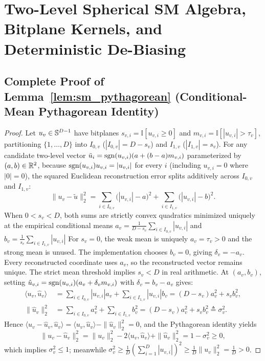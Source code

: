 \section{Two-Level Spherical SM Algebra, Bitplane Kernels, and Deterministic De-Biasing}
\label{app:sm_algebra}

\subsection{Complete Proof of Lemma~\ref{lem:sm_pythagorean} (Conditional-Mean Pythagorean Identity)}
\begin{proof}
Let $u_v \in \mathbb{S}^{D-1}$ have bitplanes $s_{v,i} = \mathbb{I}[u_{v,i} \ge 0]$ and $m_{v,i} = \mathbb{I}[|u_{v,i}| > \tau_v]$, partitioning $\{1,\dots,D\}$ into $I_{0,v}$ ($|I_{0,v}| = D - s_v$) and $I_{1,v}$ ($|I_{1,v}| = s_v$).
For any candidate two-level vector $\tilde{u}_i = \operatorname{sgn}(u_{v,i})(a + (b - a)m_{v,i})$ parameterized by $(a, b) \in \mathbb{R}^2$, because $\operatorname{sgn}(u_{v,i})u_{v,i} = |u_{v,i}|$ for every $i$ (including $u_{v,i} = 0$ where $|0| = 0$), the squared Euclidean reconstruction error splits additively across $I_{0,v}$ and $I_{1,v}$:
\begin{equation}
  \|u_v - \tilde{u}\|_2^2
  = \sum_{i \in I_{0,v}}\bigl(|u_{v,i}| - a\bigr)^2 + \sum_{i \in I_{1,v}}\bigl(|u_{v,i}| - b\bigr)^2.
\end{equation}
When $0 < s_v < D$, both sums are strictly convex quadratics minimized uniquely at the empirical conditional means $a_v = \frac{1}{D - s_v}\sum_{i \in I_{0,v}} |u_{v,i}|$ and $b_v = \frac{1}{s_v}\sum_{i \in I_{1,v}} |u_{v,i}|$ For $s_v=0$, the weak mean is uniquely $a_v=\tau_v>0$ and the strong mean is unused. The implementation chooses $b_v=0$, giving $\delta_v=-a_v$. Every reconstructed coordinate uses $a_v$, so the reconstructed vector remains unique. The strict mean threshold implies $s_v<D$ in real arithmetic.
At $(a_v, b_v)$, setting $\hat{u}_{v,i} = \operatorname{sgn}(u_{v,i})(a_v + \delta_v m_{v,i})$ with $\delta_v = b_v - a_v$ gives:
\begin{align}
  \langle u_v, \hat{u}_v\rangle
  &= \sum_{i \in I_{0,v}} |u_{v,i}| a_v + \sum_{i \in I_{1,v}} |u_{v,i}| b_v
   = (D - s_v)a_v^2 + s_v b_v^2, \\
  \|\hat{u}_v\|_2^2
  &= \sum_{i \in I_{0,v}} a_v^2 + \sum_{i \in I_{1,v}} b_v^2
   = (D - s_v)a_v^2 + s_v b_v^2 \triangleq \sigma_v^2.
\end{align}
Hence $\langle u_v - \hat{u}_v, \hat{u}_v\rangle = \langle u_v, \hat{u}_v\rangle - \|\hat{u}_v\|_2^2 = 0$, and the Pythagorean identity yields
\begin{equation}
  \|u_v - \hat{u}_v\|_2^2 = \|u_v\|_2^2 - 2\langle u_v, \hat{u}_v\rangle + \|\hat{u}_v\|_2^2 = 1 - \sigma_v^2 \ge 0,
\end{equation}
which implies $\sigma_v^2 \le 1$; meanwhile $\sigma_v^2 \ge \frac{1}{D}(\sum_{i=1}^D |u_{v,i}|)^2 \ge \frac{1}{D}\|u_v\|_2^2 = \frac{1}{D} > 0$.


\end{proof}
